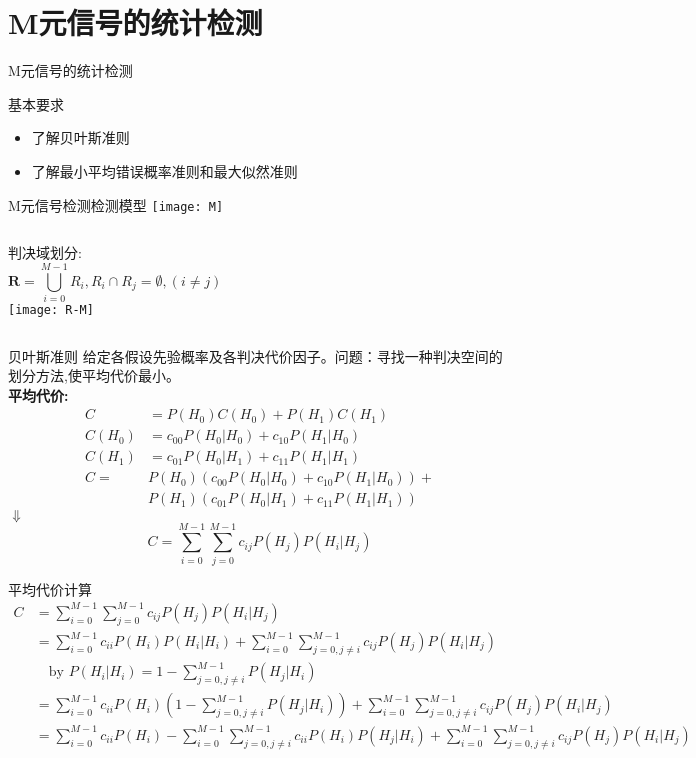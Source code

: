 \section{M元信号的统计检测}

\begin{frame}{M元信号的统计检测}
\begin{block}{基本要求}
	\begin{itemize} 
		\item 了解贝叶斯准则
		\item 了解最小平均错误概率准则和最大似然准则
	\end{itemize}
\end{block}
\end{frame}

\begin{frame}{M元信号检测检测模型}
\texttt{[image: M]}
\newline
\begin{columns}
	判决域划分:
	\[\bm{R}=\bigcup_{i=0}^{M-1}R_i, R_i\cap R_j=\emptyset, (i\ne j) \]
	\texttt{[image: R-M]}
\end{columns}
\end{frame}

\begin{frame}[shrink]{贝叶斯准则}
给定各假设先验概率及各判决代价因子。问题：寻找一种判决空间的划分方法,使平均代价最小。\\
\textbf{平均代价: }
\begin{align*}
C&=P(H_0)C(H_0)+P(H_1)C(H_1)\\
C(H_0)&=c_{00}P(H_0|H_0)+c_{10}P(H_1|H_0)\\
C(H_1)&=c_{01}P(H_0|H_1)+c_{11}P(H_1|H_1)\\
C=&P(H_0)(c_{00}P(H_0|H_0)+c_{10}P(H_1|H_0))+\\
&P(H_1)(c_{01}P(H_0|H_1)+c_{11}P(H_1|H_1))
\end{align*}
\centering$\Downarrow$
\[
C=\sum_{i=0}^{M-1}\sum_{j=0}^{M-1}c_{ij}P(H_j)P(H_i|H_j)
\]
\end{frame}

\begin{frame}[shrink]{平均代价计算}
\begin{align*}
C&=\sum_{i=0}^{M-1}\sum_{j=0}^{M-1}c_{ij}P(H_j)P(H_i|H_j)\\
&=\sum_{i=0}^{M-1}c_{ii}P(H_i)P(H_i|H_i)+\sum_{i=0}^{M-1}\sum_{j=0,j\ne i}^{M-1}c_{ij}P(H_j)P(H_i|H_j)\\
&\quad \text{by } P(H_i|H_i)=1-\sum_{j=0,j\ne i}^{M-1}P(H_j|H_i)\\
&=\sum_{i=0}^{M-1}c_{ii}P(H_i)\left(1-\sum_{j=0,j\ne i}^{M-1}P(H_j|H_i)\right)+\sum_{i=0}^{M-1}\sum_{j=0,j\ne i}^{M-1}c_{ij}P(H_j)P(H_i|H_j)\\
&=\sum_{i=0}^{M-1}c_{ii}P(H_i)-\sum_{i=0}^{M-1}\sum_{j=0,j\ne i}^{M-1}c_{ii}P(H_i)P(H_j|H_i)+\sum_{i=0}^{M-1}\sum_{j=0,j\ne i}^{M-1}c_{ij}P(H_j)P(H_i|H_j)\\
\end{align*}
\end{frame}

